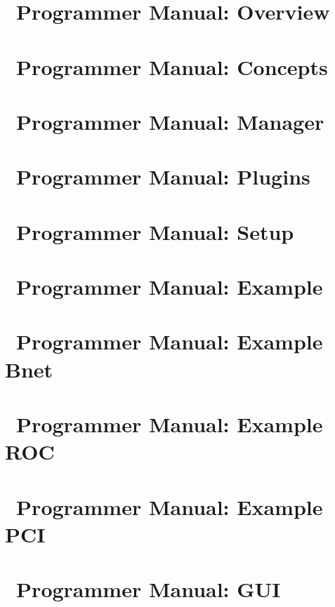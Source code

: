 \chapter{\dabc\ Programmer Manual: Overview}
 \cleardoublepage
\chapter{\dabc\ Programmer Manual: Concepts}
 \cleardoublepage

\chapter{\dabc\ Programmer Manual: Manager}
 \cleardoublepage
\chapter{\dabc\ Programmer Manual: Plugins}
 \cleardoublepage


\chapter{\dabc\ Programmer Manual: Setup}
 \cleardoublepage
%
\chapter{\dabc\ Programmer Manual: Example \mbs}
 \cleardoublepage
\chapter{\dabc\ Programmer Manual: Example Bnet}
 \cleardoublepage
\chapter{\dabc\ Programmer Manual: Example ROC}
 \cleardoublepage
\chapter{\dabc\ Programmer Manual: Example PCI}
 \cleardoublepage
\chapter{\dabc\ Programmer Manual: GUI}
 \cleardoublepage
